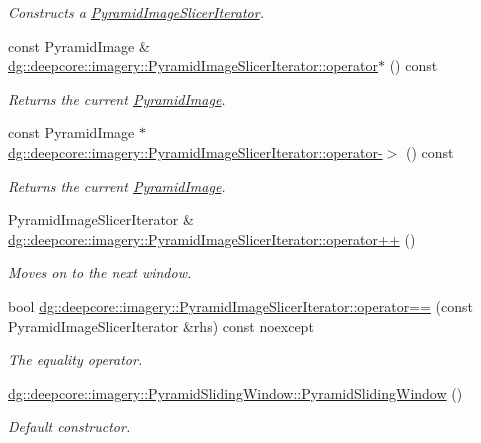 \begin{DoxyCompactItemize}
\begin{DoxyCompactList}\small\item\em Constructs a \hyperlink{classdg_1_1deepcore_1_1imagery_1_1_pyramid_image_slicer_iterator}{Pyramid\+Image\+Slicer\+Iterator}. \end{DoxyCompactList}\item 
const Pyramid\+Image \& \hyperlink{group___imagery_module_ga600dc58ba1610e9a397382f55c394c19}{dg\+::deepcore\+::imagery\+::\+Pyramid\+Image\+Slicer\+Iterator\+::operator$\ast$} () const 
\begin{DoxyCompactList}\small\item\em Returns the current \hyperlink{structdg_1_1deepcore_1_1imagery_1_1_pyramid_image}{Pyramid\+Image}. \end{DoxyCompactList}\item 
const Pyramid\+Image $\ast$ \hyperlink{group___imagery_module_gaf104201dafb494801f82aa216e2ea012}{dg\+::deepcore\+::imagery\+::\+Pyramid\+Image\+Slicer\+Iterator\+::operator-\/$>$} () const 
\begin{DoxyCompactList}\small\item\em Returns the current \hyperlink{structdg_1_1deepcore_1_1imagery_1_1_pyramid_image}{Pyramid\+Image}. \end{DoxyCompactList}\item 
Pyramid\+Image\+Slicer\+Iterator \& \hyperlink{group___imagery_module_ga5457c55fb683845dcd2735e8d37fe18c}{dg\+::deepcore\+::imagery\+::\+Pyramid\+Image\+Slicer\+Iterator\+::operator++} ()
\begin{DoxyCompactList}\small\item\em Moves on to the next window. \end{DoxyCompactList}\item 
bool \hyperlink{group___imagery_module_gac660f2df0d221e909f0ccf3e503e8c26}{dg\+::deepcore\+::imagery\+::\+Pyramid\+Image\+Slicer\+Iterator\+::operator==} (const Pyramid\+Image\+Slicer\+Iterator \&rhs) const noexcept
\begin{DoxyCompactList}\small\item\em The equality operator. \end{DoxyCompactList}\item 
\hyperlink{group___imagery_module_ga7081b8742fc33b80063c679df62eda40}{dg\+::deepcore\+::imagery\+::\+Pyramid\+Sliding\+Window\+::\+Pyramid\+Sliding\+Window} ()
\begin{DoxyCompactList}\small\item\em Default constructor. \end{DoxyCompactList}\item 

\end{DoxyCompactItemize}
